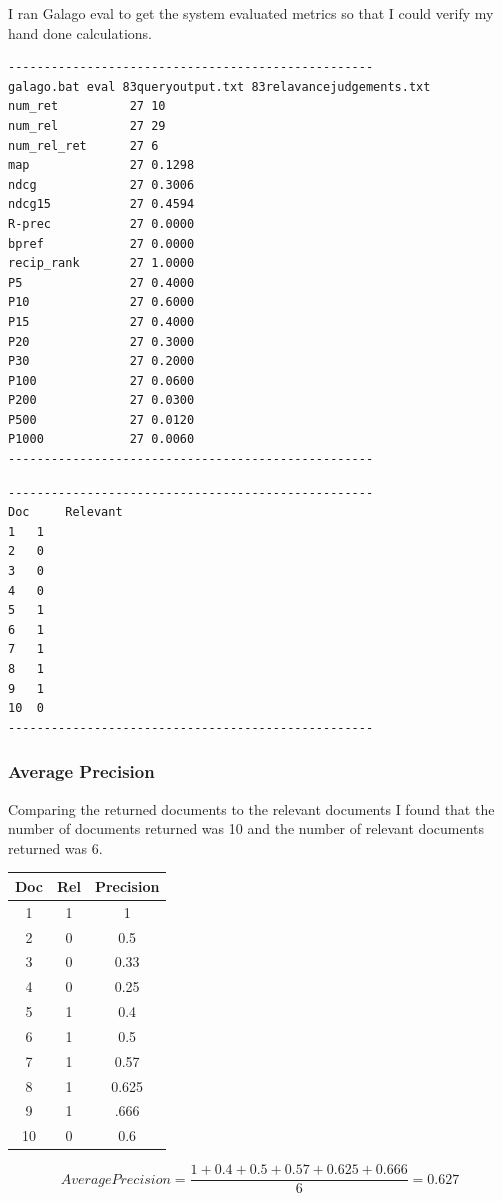 \documentclass[letterpaper,12pt]{article}
\begin{document}
I ran Galago eval to get the system evaluated metrics so that I could verify my hand done calculations.
\begin{lstlisting}[breaklines]
---------------------------------------------------
galago.bat eval 83queryoutput.txt 83relavancejudgements.txt
num_ret          27 10
num_rel          27 29
num_rel_ret      27 6
map              27 0.1298
ndcg             27 0.3006
ndcg15           27 0.4594
R-prec           27 0.0000
bpref            27 0.0000
recip_rank       27 1.0000
P5               27 0.4000
P10              27 0.6000
P15              27 0.4000
P20              27 0.3000
P30              27 0.2000
P100             27 0.0600
P200             27 0.0300
P500             27 0.0120
P1000            27 0.0060
---------------------------------------------------
\end{lstlisting}

\begin{lstlisting}[breaklines]
---------------------------------------------------
Doc 	Relevant
1	1
2	0
3	0
4 	0
5	1
6	1
7 	1
8	1
9	1
10	0
---------------------------------------------------
\end{lstlisting}
\subsubsection{Average Precision}

Comparing the returned documents to the relevant documents I found that the number of documents returned was 10 and the number of relevant documents returned was 6. 

\begin{center}
\begin{tabular}{ |c|c|c| } 
 \hline
 Doc & Rel & Precision \\ 
\hline
 1 & 1 & 1\\ 
 2 & 0 & 0.5\\ 
 3 & 0 & 0.33\\ 
 4 & 0 & 0.25\\ 
 5 & 1 & 0.4\\ 
 6 & 1 & 0.5\\ 
 7 & 1 & 0.57\\ 
 8 & 1 & 0.625\\ 
 9 & 1 & .666\\ 
 10 & 0 & 0.6\\ 
 \hline
\end{tabular}
\end{center}

$$Average Precision = \frac{1 + 0.4 + 0.5 + 0.57 + 0.625 + 0.666 }{6} = 0.627 $$
\end{document}
